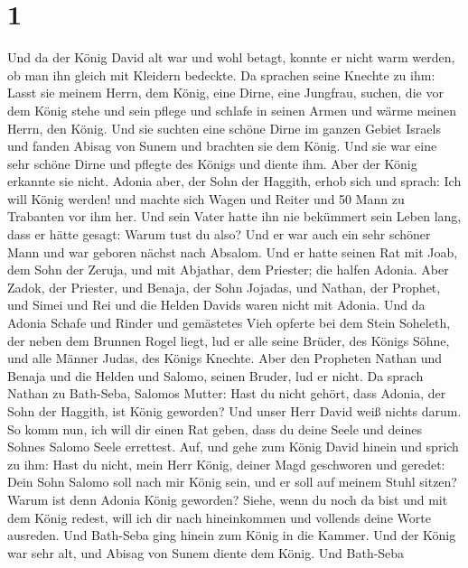 \hypertarget{section}{%
\section{1}\label{section}}

 Und da der König David alt war und wohl betagt, konnte er
nicht warm werden, ob man ihn gleich mit Kleidern bedeckte. 
Da sprachen seine Knechte zu ihm: Lasst sie meinem Herrn, dem König,
eine Dirne, eine Jungfrau, suchen, die vor dem König stehe und sein
pflege und schlafe in seinen Armen und wärme meinen Herrn, den König.
 Und sie suchten eine schöne Dirne im ganzen Gebiet Israels
und fanden Abisag von Sunem und brachten sie dem König.  Und
sie war eine sehr schöne Dirne und pflegte des Königs und diente ihm.
Aber der König erkannte sie nicht.  Adonia aber, der Sohn
der Haggith, erhob sich und sprach: Ich will König werden! und machte
sich Wagen und Reiter und 50 Mann zu Trabanten vor ihm her. 
Und sein Vater hatte ihn nie bekümmert sein Leben lang, dass er hätte
gesagt: Warum tust du also? Und er war auch ein sehr schöner Mann und
war geboren nächst nach Absalom.  Und er hatte seinen Rat
mit Joab, dem Sohn der Zeruja, und mit Abjathar, dem Priester; die
halfen Adonia.  Aber Zadok, der Priester, und Benaja, der
Sohn Jojadas, und Nathan, der Prophet, und Simei und Rei und die Helden
Davids waren nicht mit Adonia.  Und da Adonia Schafe und
Rinder und gemästetes Vieh opferte bei dem Stein Soheleth, der neben dem
Brunnen Rogel liegt, lud er alle seine Brüder, des Königs Söhne, und
alle Männer Judas, des Königs Knechte.  Aber den Propheten
Nathan und Benaja und die Helden und Salomo, seinen Bruder, lud er
nicht.  Da sprach Nathan zu Bath-Seba, Salomos Mutter: Hast
du nicht gehört, dass Adonia, der Sohn der Haggith, ist König geworden?
Und unser Herr David weiß nichts darum.  So komm nun, ich
will dir einen Rat geben, dass du deine Seele und deines Sohnes Salomo
Seele errettest.  Auf, und gehe zum König David hinein und
sprich zu ihm: Hast du nicht, mein Herr König, deiner Magd geschworen
und geredet: Dein Sohn Salomo soll nach mir König sein, und er soll auf
meinem Stuhl sitzen? Warum ist denn Adonia König geworden? 
Siehe, wenn du noch da bist und mit dem König redest, will ich dir nach
hineinkommen und vollends deine Worte ausreden.  Und
Bath-Seba ging hinein zum König in die Kammer. Und der König war sehr
alt, und Abisag von Sunem diente dem König.  Und Bath-Seba
